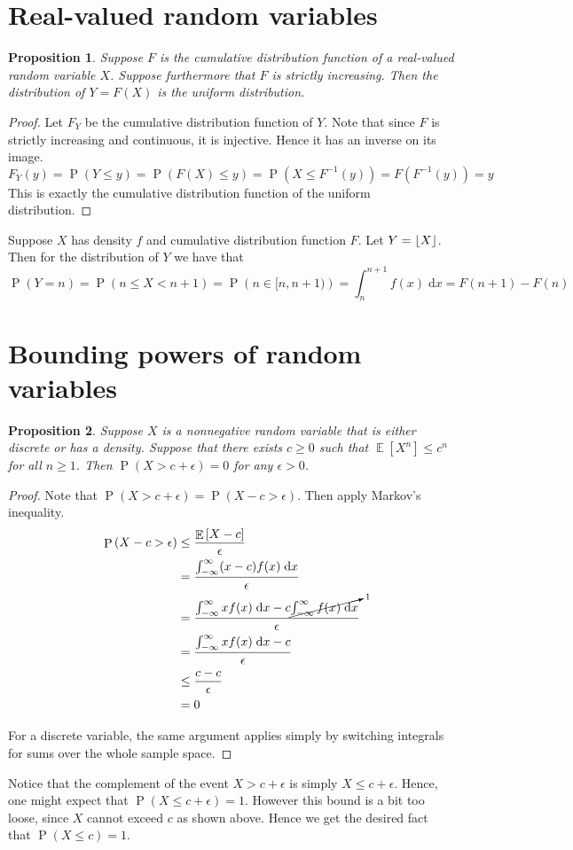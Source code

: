 \documentclass[11pt]{article}
\newtheorem{prop}{Proposition}
\theoremstyle{definition}
\theoremstyle{remark}
\newcommand{\question}{\section}
\newcommand{\parens}[1]{\left(#1\right)}
\DeclarePairedDelimiter{\floor}{\lfloor}{\rfloor}
\newcommand{\inv}{^{-1}}
\renewcommand{\d}{\mathrm{d}}
\newcommand{\intd}{\;\d}
\newcommand{\infinfint}{%
    \ensuremath \int_{-\infty}^{\infty}
}
\DeclareMathOperator{\Prob}{P}
\renewcommand{\P}[1]{\Prob{\parens{#1}}}
\DeclareMathOperator{\Expect}{\mathbb{E}}
\newcommand{\E}[1]{\Expect{\left[#1\right]}}
\newcommand{\cdf}{cumulative distribution function}
\begin{document}
\question{Real-valued random variables}

\begin{prop}
    Suppose $F$ is the \cdf{} of a real-valued random variable $X$.
    Suppose furthermore that $F$ is strictly increasing.
    Then the distribution of $Y = F(X)$ is the uniform distribution.
\end{prop}

\begin{proof}
    Let $F_Y$ be the \cdf{} of $Y$.
    Note that since $F$ is strictly increasing and continuous, it is injective.
    Hence it has an inverse on its image.
    \begin{equation*}
        F_Y(y)
        = \P{Y \leq y}
        = \P{F(X) \leq y}
        = \P{X \leq F\inv(y)}
        = F(F\inv(y))
        = y
    \end{equation*}
    This is exactly the \cdf{} of the uniform distribution.
\end{proof}

Suppose $X$ has density $f$ and \cdf{} $F$.
Let $Y = \floor*{X}$.
Then for the distribution of $Y$ we have that
\begin{equation*}
    \P{Y = n}
    = \P{n \leq X < n+1}
    = \P{n \in [n, n+1)}
    = \int_n^{n+1} { f(x) \intd x }
    = F(n+1) - F(n)
\end{equation*}

\question{Bounding powers of random variables}

\begin{prop}
    Suppose $X$ is a nonnegative random variable that is either discrete or has
    a density. Suppose that there exists $c \geq 0$ such that
    $\E{X^n} \leq c^n$ for all $n \geq 1$.
    Then $\P{X > c + \epsilon} = 0$ for any $\epsilon > 0$.
\end{prop}

\begin{proof}
    Note that $\P{X > c + \epsilon} = \P{X - c > \epsilon}$.
    Then apply Markov's inequality.
    \begin{align*}
        \P{X - c > \epsilon}
        &\leq \frac{\E{X - c}}{\epsilon} \\
        &= \frac{\infinfint (x - c) f(x) \intd x}{\epsilon} \\
        &= \frac{
            \infinfint x f(x) \intd x
            -
            c \cancelto{1}{\infinfint f(x) \intd x}
        }{
            \epsilon
        } \\
        &= \frac{ \infinfint x f(x) \intd x - c }{ \epsilon } \\
        &\leq \frac{c - c}{\epsilon} \\
        &= 0
    \end{align*}

    For a discrete variable, the same argument applies simply by switching
    integrals for sums over the whole sample space.
\end{proof}

Notice that the complement of the event $X > c + \epsilon$ is simply
$X \leq c + \epsilon$.
Hence, one might expect that $\P{X \leq c + \epsilon} = 1$.
However this bound is a bit too loose, since $X$ cannot exceed $c$ as shown
above.
Hence we get the desired fact that $\P{X \leq c} = 1$.
\end{document}
